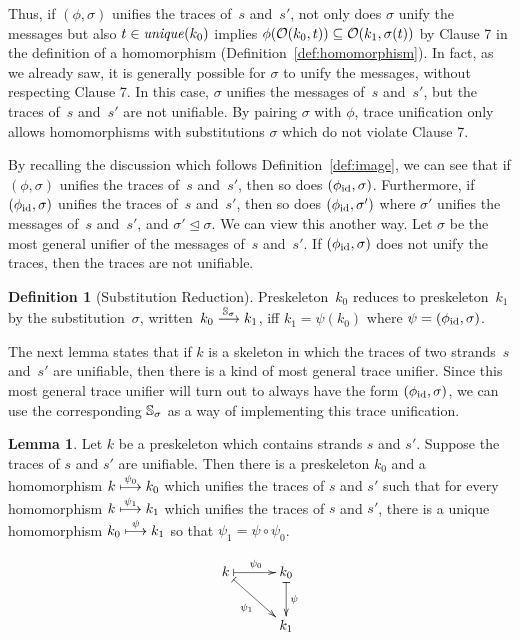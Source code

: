 \documentclass[12pt]{article}
\theoremstyle{definition}
\newtheorem{defn}{Definition}[section]
\newtheorem{lem}[thm]{Lemma}
\begin{document}
Thus, if $(\phi,\sigma)$ unifies the traces of~$s$ and~$s'$,
not only does $\sigma$ unify the messages
but also $t\in \operatorname{\mathit{unique}}(k_0)$ implies
$\phi(\mathcal{O}(k_0,t))\subseteq\mathcal{O}(k_1,\sigma(t))$ by Clause 7 in the
definition of a homomorphism (Definition~\ref{def:homomorphism}).
In fact, as we already saw, it is generally possible for $\sigma$
to unify the messages, without respecting Clause 7. In this case,
$\sigma$ unifies the messages of~$s$ and~$s'$, but the traces
of~$s$ and~$s'$ are not unifiable.  By pairing
$\sigma$ with $\phi$, trace unification only allows homomorphisms
with substitutions $\sigma$ which do not violate Clause 7.

By recalling the discussion which follows Definition~\ref{def:image},
we can see that if $(\phi,\sigma)$ unifies the traces of~$s$ and~$s'$,
then so does $(\phi_{\mathrm{id}},\sigma)$.  Furthermore, if $(\phi_{\mathrm{id}},\sigma)$ unifies
the traces of~$s$ and~$s'$, then so does $(\phi_{\mathrm{id}},\sigma')$ where
$\sigma'$ unifies the messages of~$s$ and~$s'$, and
$\sigma'\unlhd\sigma$.  We can view this another way.  Let $\sigma$
be the most general unifier of the messages of~$s$ and~$s'$.  If $(\phi_{\mathrm{id}},\sigma)$
does not unify the traces, then the traces are not unifiable.

\begin{defn}[Substitution Reduction]
Preskeleton~$k_0$ reduces to preskeleton~$k_1$ by the
substitution~$\sigma$, written~$k_0\stackrel{\mathbb S_\sigma}{\longrightarrow}k_1$, iff
$k_1=\psi(k_0)$ where $\psi=(\phi_{\mathrm{id}},\sigma)$.
\end{defn}

The next lemma states that if $k$ is a skeleton in which the traces of
two strands~$s$ and~$s'$ are unifiable, then there is a kind of most
general trace unifier.  Since this most general trace unifier will
turn out to always have the form $(\phi_{\mathrm{id}},\sigma)$, we can use the
corresponding $\mathbb S_{\sigma}$ as a way of implementing this trace
unification.

\begin{lem}\label{lem:substitution}
Let $k$ be a preskeleton which contains strands $s$ and $s'$.  Suppose the
traces of $s$ and $s'$ are unifiable.  Then there is a preskeleton $k_0$ and
a homomorphism $k\stackrel{\psi_0}{\longmapsto}k_0$ which unifies the traces
of $s$ and $s'$ such that for every
homomorphism $k\stackrel{\psi_1}{\longmapsto}k_1$ which
unifies the traces of $s$ and $s'$, there is a unique homomorphism
$k_0\stackrel{\psi}{\longmapsto}k_1$ so that $\psi_1=\psi\circ\psi_0$.

$$\xymatrix@C=3em{
k\ar@{|->}[r]^{\psi_0} \ar@{|->}[rd]_{\psi_1} &
k_0 \ar@{|->}[d]^{\psi}\\
&k_1}$$
\end{lem}
\end{document}
